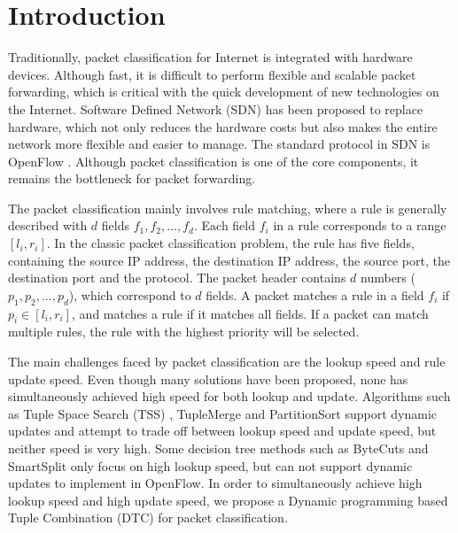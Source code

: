 \section{Introduction}

Traditionally, packet classification for Internet is integrated with hardware devices. Although fast, it is difficult to perform flexible and scalable packet forwarding, which is critical with the quick development of new technologies on the Internet. Software Defined Network (SDN) \cite{kuzniar2015you} has been proposed to replace hardware, which not only reduces the hardware costs but also makes the entire network more flexible and easier to manage. The standard protocol in SDN is OpenFlow \cite{mckeown2008openflow}. Although packet classification is one of the core components, it remains the bottleneck for packet forwarding.


The packet classification mainly involves rule matching, where a rule is generally described with $d$ fields $f_1,f_2,...,f_d$. Each field $f_i$ in a rule corresponds to a range $[l_i,r_i]$. In the classic packet classification problem, the rule has five fields, containing the source IP address, the destination IP address, the source port, the destination port and the protocol. The packet header contains $d$ numbers ($p_1,p_2,...,p_d$), which correspond to $d$ fields. A packet matches a rule in a field $f_i$ if $p_i \in [l_i,r_i]$, and matches a rule if it matches all fields. If a packet can match multiple rules, the rule with the highest priority will be selected.

The main challenges faced by packet classification are the lookup speed and rule update speed. Even though many solutions have been proposed, none has simultaneously achieved high speed for both lookup and update. Algorithms such as Tuple Space Search (TSS) \cite{srinivasan1999packet}, TupleMerge \cite{daly2017tuplemerge} and PartitionSort \cite{yingchareonthawornchai2016sorted} support dynamic updates and attempt to trade off between lookup speed and update speed, but neither speed is very high.
Some decision tree methods such as ByteCuts \cite{daly2018bytecuts} and SmartSplit \cite{he2014meta} only focus on high lookup speed, but can not support dynamic updates to implement in OpenFlow. In order to simultaneously achieve high lookup speed and high update speed, we propose a Dynamic programming based Tuple Combination (DTC) for packet classification.

